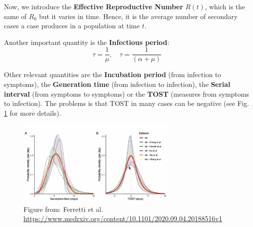 \documentclass[../main/main.tex]{subfiles}
\begin{document}
Now, we introduce the \textbf{Effective Reproductive Number} \( R(t) \), which is the same of \( R_0 \) but it varies in time. Hence, it is the average number of secondary cases a case produces in a population at time \( t \).

Another important quantity is the \textbf{Infectious period}:
\begin{equation}
  \tau = \frac{1}{\mu }, \quad \tau = \frac{1}{(\alpha + \mu )}
\end{equation}

Other relevant quantities are the \textbf{Incubation period} (from infection to symptoms), the \textbf{Generation time} (from infection to infection), the \textbf{Serial interval} (from symptoms to symptoms) or the \textbf{TOST} (measures from symptoms to infection). The problems is that TOST in many cases can be negative (see Fig. \ref{fig:4_TOST} for more details).

\begin{figure}[h!]
\centering
\includegraphics[width=0.7\textwidth]{../lessons/image/4_TOST.png}
\caption{\label{fig:4_TOST} Figure from: Ferretti et al. \url{https://www.medrxiv.org/content/10.1101/2020.09.04.20188516v1}}
\end{figure}
\end{document}
